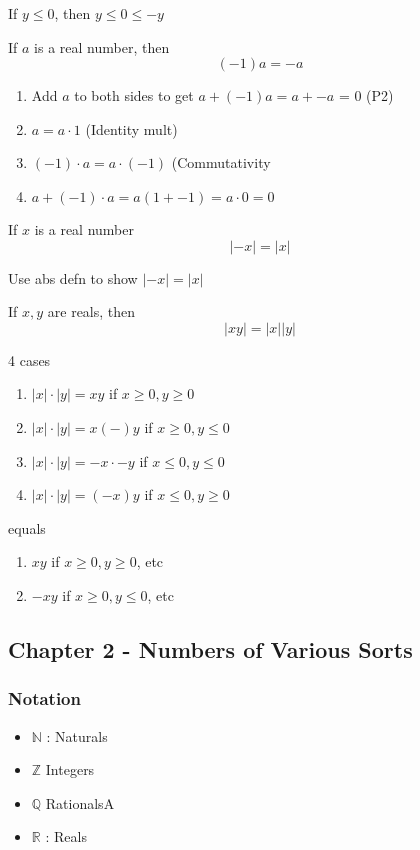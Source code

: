\documentclass{report}
\begin{document}
   {
    If $ y \leq 0$, then  $y \leq 0  \leq -y$
  }

  \ex{} {
    If $a$ is a real number, then
    \[ (-1) a = -a \]

    \begin{enumerate}
      \item Add $a$  to both sides to get $a + (-1) a = a + -a$ = 0 (P2)
      \item $a = a \cdot 1$ (Identity mult)
      \item $(-1) \cdot a = a\cdot (-1)$ (Commutativity
      \item $a+(-1) \cdot a = a(1 + -1) = a \cdot 0 = 0$
    \end{enumerate}
  }

  \ex{} {
    If $x$ is a real number
    \[ |-x| = |x| \]

    Use abs defn to show $|-x| = |x|$
  }

  \ex{} {
    If $x,y$ are reals, then
      \[ |xy| = |x||y| \]

      4 cases
      \begin{enumerate}
        \item $|x| \cdot |y| = xy$ if $x \geq 0, y \geq 0$
        \item $|x| \cdot |y| = x(-)y$ if $x \geq 0, y \leq 0$
        \item $|x| \cdot |y| = -x \cdot -y$ if $x \leq 0, y \leq 0$
        \item $|x| \cdot |y| = (-x)y$ if $x \leq 0, y \geq 0$
      \end{enumerate}
      equals
      \begin{enumerate}
        \item $xy$ if $x \geq 0, y \geq 0$, etc
        \item $-xy$ if $x \geq 0, y \leq 0$,  etc
      \end{enumerate}
  }

  \subsection*{Chapter 2 - Numbers of Various Sorts}%
  \subsubsection*{Notation}%
    \begin{itemize}
      \item $\mathbb{N} $ : Naturals
      \item $\mathbb{Z} $ Integers
      \item $\mathbb{Q} $ RationalsA
      \item $\mathbb{R}$ : Reals
    \end{itemize}
\end{document}
